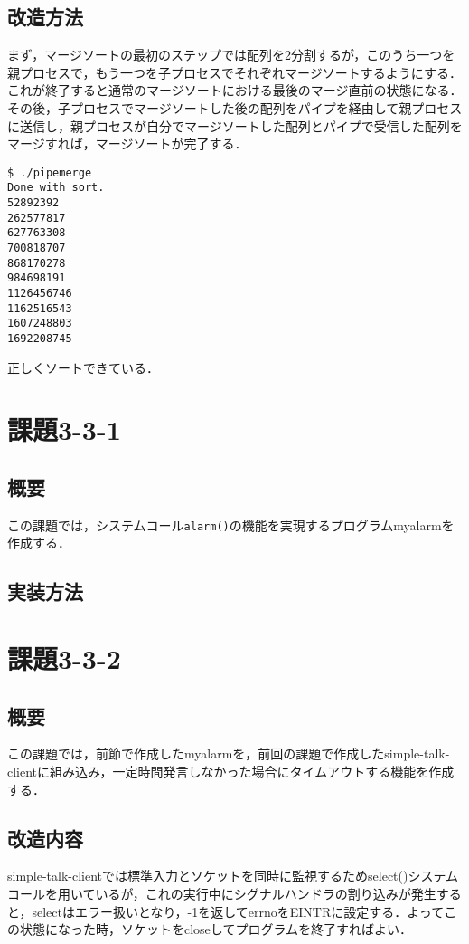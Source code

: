 \documentclass[a4j,10pt,titlepage]{jsarticle}
\begin{document}
\subsection{改造方法}
まず，マージソートの最初のステップでは配列を2分割するが，このうち一つを親プロセスで，もう一つを子プロセスでそれぞれマージソートするようにする．これが終了すると通常のマージソートにおける最後のマージ直前の状態になる．その後，子プロセスでマージソートした後の配列をパイプを経由して親プロセスに送信し，親プロセスが自分でマージソートした配列とパイプで受信した配列をマージすれば，マージソートが完了する．

\begin{verbatim}
$ ./pipemerge 
Done with sort.
52892392
262577817
627763308
700818707
868170278
984698191
1126456746
1162516543
1607248803
1692208745
\end{verbatim}
正しくソートできている．

\section{課題3-3-1}
\subsection{概要}
この課題では，システムコール\verb|alarm()|の機能を実現するプログラムmyalarmを作成する．

\subsection{実装方法}


\section{課題3-3-2}
\subsection{概要}
この課題では，前節で作成したmyalarmを，前回の課題で作成したsimple-talk-clientに組み込み，一定時間発言しなかった場合にタイムアウトする機能を作成する．

\subsection{改造内容}
simple-talk-clientでは標準入力とソケットを同時に監視するためselect()システムコールを用いているが，これの実行中にシグナルハンドラの割り込みが発生すると，selectはエラー扱いとなり，-1を返してerrnoをEINTRに設定する．よってこの状態になった時，ソケットをcloseしてプログラムを終了すればよい．
\end{document}
